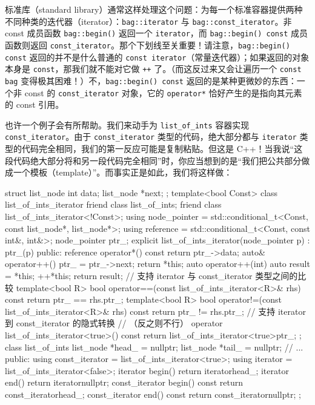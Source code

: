 标准库（standard library）通常这样处理这个问题：为每一个标准容器提供两种不同种类的迭代器（iterator）：\texttt{bag::\allowbreak{}iterator} 与 \texttt{bag::\allowbreak{}const\_\allowbreak{}iterator}。非 const 成员函数 \texttt{bag::\allowbreak{}begin(\allowbreak{})\allowbreak{}} 返回一个 \texttt{iterator}，而 \texttt{bag::\allowbreak{}begin(\allowbreak{})\allowbreak{} const} 成员函数则返回 \texttt{const\_\allowbreak{}iterator}。那个下划线至关重要！请注意，\texttt{bag::\allowbreak{}begin(\allowbreak{})\allowbreak{} const} 返回的并不是什么普通的 \texttt{const iterator}（常量迭代器）；如果返回的对象本身是 \texttt{const}，那我们就不能对它做 \texttt{++} 了。（而这反过来又会让遍历一个 \texttt{const bag} 变得极其困难！）不，\texttt{bag::\allowbreak{}begin(\allowbreak{})\allowbreak{} const} 返回的是某种更微妙的东西：一个非 const 的 \texttt{const\_\allowbreak{}iterator} 对象，它的 \texttt{operator*} 恰好产生的是指向其元素的 const 引用。

也许一个例子会有所帮助。我们来动手为 \texttt{list\_\allowbreak{}of\_\allowbreak{}ints} 容器实现 \texttt{const\_\allowbreak{}iterator}。由于 \texttt{const\_\allowbreak{}iterator} 类型的代码，绝大部分都与 \texttt{iterator} 类型的代码完全相同，我们的第一反应可能是复制粘贴。但这是 C++！当我说“这段代码绝大部分将和另一段代码完全相同”时，你应当想到的是“我们把公共部分做成一个模板（template）”。而事实正是如此，我们将这样做：

\begin{codebox}[cpp]
    struct list_node {
      int data;
      list_node *next;
    };
    template<bool Const>
    class list_of_ints_iterator {
      friend class list_of_ints;
      friend class list_of_ints_iterator<!Const>;
      using node_pointer = std::conditional_t<Const, const list_node*,
list_node*>;
      using reference = std::conditional_t<Const, const int&, int&>;
      node_pointer ptr_;
      explicit list_of_ints_iterator(node_pointer p) : ptr_(p) {}
    public:
      reference operator*() const { return ptr_->data; }
      auto& operator++() { ptr_ = ptr_->next; return *this; }
      auto operator++(int) { auto result = *this; ++*this; return result; }
      // 支持 iterator 与 const_iterator 类型之间的比较
      template<bool R>
      bool operator==(const list_of_ints_iterator<R>& rhs) const
        { return ptr_ == rhs.ptr_; }
      template<bool R>
      bool operator!=(const list_of_ints_iterator<R>& rhs) const
        { return ptr_ != rhs.ptr_; }
      // 支持 iterator 到 const_iterator 的隐式转换
      // （反之则不行）
      operator list_of_ints_iterator<true>() const
        { return list_of_ints_iterator<true>{ptr_}; }
    };
    class list_of_ints {
      list_node *head_ = nullptr;
      list_node *tail_ = nullptr;
      // ...
    public:
      using const_iterator = list_of_ints_iterator<true>;
      using iterator = list_of_ints_iterator<false>;
      iterator begin() { return iterator{head_}; }
      iterator end() { return iterator{nullptr}; }
      const_iterator begin() const { return const_iterator{head_}; }
      const_iterator end() const { return const_iterator{nullptr}; }
    };
\end{codebox}

